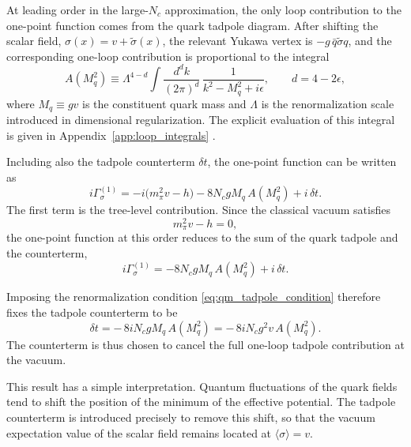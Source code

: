 At leading order in the large-\(N_c\) approximation, the only loop
contribution to the one-point function comes from the quark tadpole
diagram. After shifting the scalar field,
\(\sigma(x)=v+\tilde{\sigma}(x)\), the relevant Yukawa vertex is
\(-g\,\bar q \tilde{\sigma} q\), and the corresponding one-loop
contribution is proportional to the integral
\begin{equation}
A(M_q^2)
\equiv
\Lambda^{4-d}
\int \frac{d^d k}{(2\pi)^d}\,
\frac{1}{k^2-M_q^2+i\epsilon},
\qquad d=4-2\epsilon ,
\label{eq:qm_A_integral}
\end{equation}
where \(M_q \equiv gv\) is the constituent quark mass and \(\Lambda\)
is the renormalization scale introduced in dimensional
regularization. The explicit evaluation of this integral is given in
Appendix~\ref{app:loop_integrals} \cite{Folkestad2018,Andersen2024}.

Including also the tadpole counterterm \(\delta t\), the one-point
function can be written as
\begin{equation}
i\Gamma^{(1)}_{\sigma}
=
-i\bigl(m_\pi^2 v - h\bigr)
- 8 N_c g M_q\, A(M_q^2)
+ i\,\delta t .
\label{eq:qm_one_point_function}
\end{equation}
The first term is the tree-level contribution. Since the classical
vacuum satisfies
\begin{equation}
m_\pi^2 v - h = 0 ,
\label{eq:qm_tree_level_stationarity}
\end{equation}
the one-point function at this order reduces to the sum of the quark
tadpole and the counterterm,
\begin{equation}
i\Gamma^{(1)}_{\sigma}
=
- 8 N_c g M_q\, A(M_q^2)
+ i\,\delta t .
\label{eq:qm_one_point_reduced}
\end{equation}

Imposing the renormalization condition
\eqref{eq:qm_tadpole_condition} therefore fixes the tadpole
counterterm to be
\begin{equation}
\delta t
=
-\,8 i N_c g M_q\, A(M_q^2)
=
-\,8 i N_c g^2 v\, A(M_q^2).
\label{eq:qm_tadpole_counterterm}
\end{equation}
The counterterm is thus chosen to cancel the full one-loop tadpole
contribution at the vacuum.

This result has a simple interpretation. Quantum fluctuations of the
quark fields tend to shift the position of the minimum of the
effective potential. The tadpole counterterm is introduced precisely
to remove this shift, so that the vacuum expectation value of the scalar 
field remains located at \(\langle \sigma \rangle = v\). 

